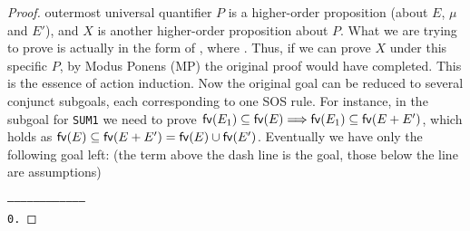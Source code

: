 \begin{proof}
outermost universal quantifier $P$ is a higher-order
proposition (about $E$, $\mu$ and $E'$), and $X$ is another higher-order
proposition about $P$.
What we are trying to prove is actually in the form of
, where
. Thus, if we can prove
$X$ under this specific $P$, by Modus Ponens (MP) the original proof
would have completed.
This is the essence of action induction.
Now the original goal can be reduced to several conjunct
subgoals, each corresponding to one SOS rule. For instance, in
the subgoal for \texttt{SUM1} we need to prove
${{\rm\sf{fv}}}(E_1) \subseteq {{\rm\sf{fv}}}(E) \Longrightarrow
{{\rm\sf{fv}}}(E_1) \subseteq {{\rm\sf{fv}}}(E + E')$, which holds as ${{\rm\sf{fv}}}(E)
\subseteq {{\rm\sf{fv}}}(E + E') = {{\rm\sf{fv}}}(E) \cup {{\rm\sf{fv}}}(E')$. Eventually we have only
the following goal left: (the term above the dash line is the goal,
those below the line are assumptions)
\begin{alltt}
   ------------------------------------
    0.  

\end{alltt}
\end{proof}
